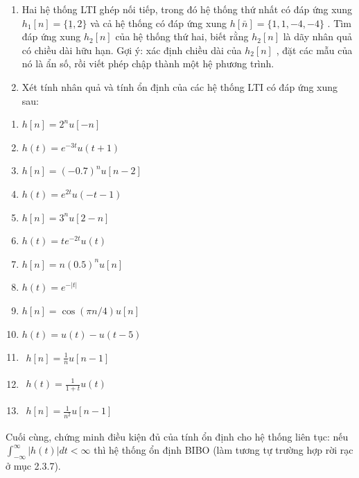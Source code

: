 \documentclass[
  10
]{article}
\begin{document}
\begin{enumerate}
\def\labelenumi{\arabic{enumi}.}
\setcounter{enumi}{10}
\item
  Hai hệ thống LTI ghép nối tiếp, trong đó hệ thống thứ nhất có đáp ứng
  xung \(h _ { 1 } [ n ] = \{ \underline { { { 1 } } } , 2 \}\) và cả hệ
  thống có đáp ứng xung \(h [ \bar { n } ] = \{ 1 , 1 , - 4 , - 4 \}\) .
  Tìm đáp ứng xung \(h _ { 2 } [ n ]\) của hệ thống thứ hai, biết rằng
  \(h _ { 2 } [ n ]\) là dãy nhân quả có chiều dài hữu hạn. Gợi ý: xác
  định chiều dài của \(h _ { 2 } [ n ]\) , đặt các mẫu của nó là ẩn số,
  rồi viết phép chập thành một hệ phương trình.
\item
  Xét tính nhân quả và tính ổn định của các hệ thống LTI có đáp ứng xung
  sau:
\end{enumerate}

\begin{enumerate}
\def\labelenumi{(\alph{enumi})}
\item
  \(h [ n ] = 2 ^ { n } u [ - n ]\)
\item
  \(h ( t ) = e ^ { - 3 t } u ( t + 1 )\)
\item
  \(h [ n ] = ( - 0 . 7 ) ^ { n } u [ n - 2 ]\)
\item
  \(h ( t ) = e ^ { 2 t } u ( - t - 1 )\)
\item
  \(h [ n ] = 3 ^ { n } u [ 2 - n ]\)
\item
  \(h ( t ) = t e ^ { - 2 t } u ( t )\)
\item
  \(h [ n ] = n ( 0 . 5 ) ^ { n } u [ n ]\)
\item
  \(h ( t ) = e ^ { - | t | }\)
\item
  \(h [ n ] = \cos ( \pi n / 4 ) u [ n ]\)
\item
  \(h ( t ) = u ( t ) - u ( t - 5 )\)
\item
  \(\begin{array} { r } { h [ n ] = \frac { 1 } { n } u [ n - 1 ] } \end{array}\)
\item
  \(\begin{array} { r } { h ( t ) = \frac { 1 } { 1 + t } u ( t ) } \end{array}\)
\item
  \(\begin{array} { r } { h [ n ] = \frac { 1 } { n ^ { 2 } } u [ n - 1 ] } \end{array}\)
\end{enumerate}

Cuối cùng, chứng minh điều kiện đủ của tính ổn định cho hệ thống liên
tục: nếu
\(\textstyle \int _ { - \infty } ^ { \infty } | h ( t ) | d t < \infty\)
thì hệ thống ổn định BIBO (làm tương tự trường hợp rời rạc ở mục 2.3.7).
\end{document}
